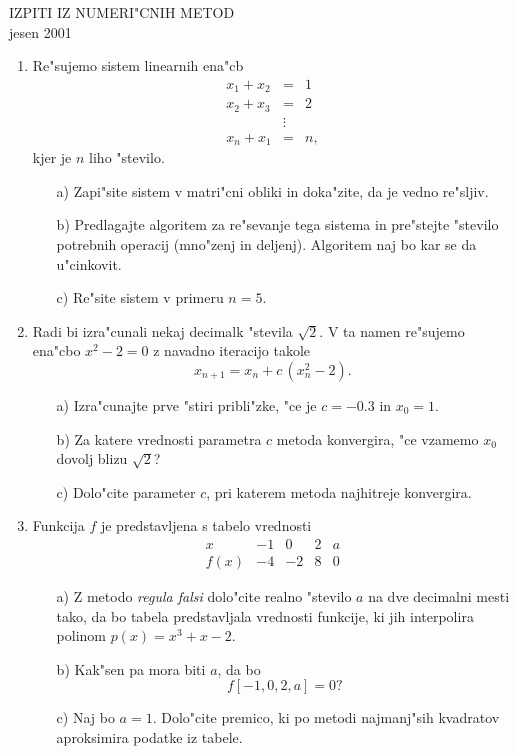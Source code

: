 \documentclass[12pt,a4paper]{article}
\begin{document}
\begin{center}
  IZPITI IZ NUMERI"CNIH METOD\\
  jesen 2001
\end{center}
\begin{enumerate}
 \item Re"sujemo sistem linearnih ena"cb
    \begin{eqnarray*}
      x_1+x_2 &=& 1\\
      x_2+x_3 &=& 2\\
              &\vdots&\\
      x_n+x_1 &=& n,
    \end{eqnarray*}
    kjer je $n$ liho "stevilo.
 \begin{itemize}
    \item[a)] Zapi"site sistem v matri"cni obliki in doka"zite,
      da je vedno re"sljiv.
    \item[b)] Predlagajte algoritem za re"sevanje tega sistema in
      pre"stejte "stevilo potrebnih operacij (mno"zenj in deljenj).
      Algoritem naj bo kar se da u"cinkovit.
    \item[c)] Re"site sistem v primeru $n=5$.
 \end{itemize}

 \item Radi bi izra"cunali nekaj decimalk "stevila 
        $\sqrt{2}$. V ta namen re"sujemo ena"cbo $x^2-2=0$
        z navadno iteracijo takole
        $$x_{n+1}=x_n+c\,(x_n^2-2).$$
 \begin{itemize}
      \item[a)] Izra"cunajte prve "stiri pribli"zke, "ce je
        $c=-0.3$ in $x_0=1$.
      \item[b)] Za katere vrednosti parametra $c$ metoda 
        konvergira, "ce vzamemo $x_0$ dovolj blizu $\sqrt{2}$?
      \item[c)] Dolo"cite parameter $c$, pri katerem metoda 
        najhitreje konvergira.
 \end{itemize}

 \item Funkcija $f$ je predstavljena s tabelo vrednosti
    $$
    \begin{array}{c|cccc}
      x&-1&0&2&a\\
      \hline
      f(x)&-4&-2&8&0
    \end{array}
    $$
  \begin{itemize}
     \item[a)] Z metodo {\sl regula falsi} dolo"cite realno "stevilo
      $a$ na dve decimalni mesti tako, da bo tabela predstavljala
      vrednosti funkcije, ki jih interpolira polinom
      $p(x)=x^3+x-2$.
     \item[b)] Kak"sen pa mora biti $a$, da bo 
      $$f[-1,0,2,a]=0?$$
     \item[c)] Naj bo $a=1$. Dolo"cite premico, ki po metodi
      najmanj"sih kvadratov aproksimira podatke iz tabele.
  \end{itemize}


\end{enumerate}
\end{document}
